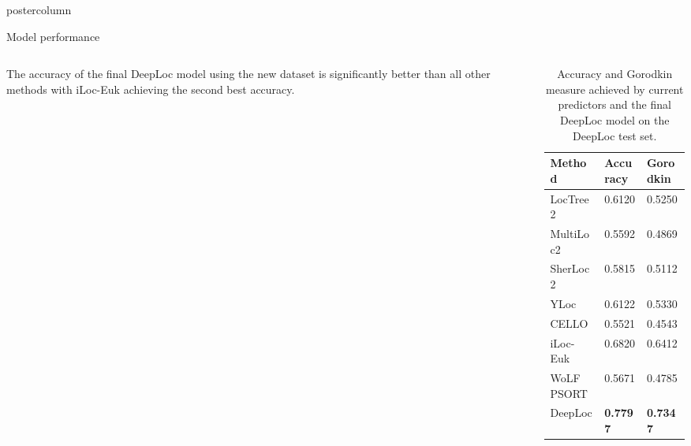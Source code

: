 \documentclass[final,hyperref={pdfpagelabels=false}]{beamer}
\begin{document}
\begin{frame}
\begin{columns}
\begin{column}{.49\paperwidth}
\begin{beamercolorbox}[center,wd=\textwidth]{postercolumn}
\begin{minipage}[T]{.99\textwidth}
{%

 \begin{block}{Model performance}
 \begin{columns}
 \begin{column}{1\textwidth}


\vspace{-1cm}

\centering
\begin{minipage}[t]{0.96\textwidth}
			
\begin{columns}
\begin{column}{0.30\textwidth} 
\justifying
\small{The accuracy of the final DeepLoc model using the new dataset is significantly better than all other methods with iLoc-Euk achieving the second best accuracy.}
\end{column}
\begin{column}{0.59\textwidth}
\begin{table}[h]
\small
\centering
\caption{Accuracy and Gorodkin measure \citep{gorodkin2004comparing} achieved by current predictors and the final DeepLoc model on the DeepLoc test set.\label{Res:current}}
\begin{tabular}{p{9cm}p{6cm}p{6cm}}
\toprule
Method & Accuracy &  Gorodkin \\
\midrule
LocTree2 & 0.6120 & 0.5250 \\
MultiLoc2 & 0.5592 & 0.4869 \\
SherLoc2 & 0.5815 & 0.5112 \\
YLoc & 0.6122 & 0.5330 \\
CELLO & 0.5521 & 0.4543 \\
iLoc-Euk & 0.6820 & 0.6412 \\
WoLF PSORT & 0.5671 & 0.4785 \\
DeepLoc & \textbf{0.7797} & \textbf{0.7347} \\
\bottomrule
\end{tabular}
\end{table}
\end{column}
\end{columns}


\end{minipage}



\vspace{0.5cm}

					
                  

\end{column}
\end{columns}
\end{block}}
\end{minipage}
\end{beamercolorbox}
\end{column}
\end{columns}
\end{frame}
\end{document}
